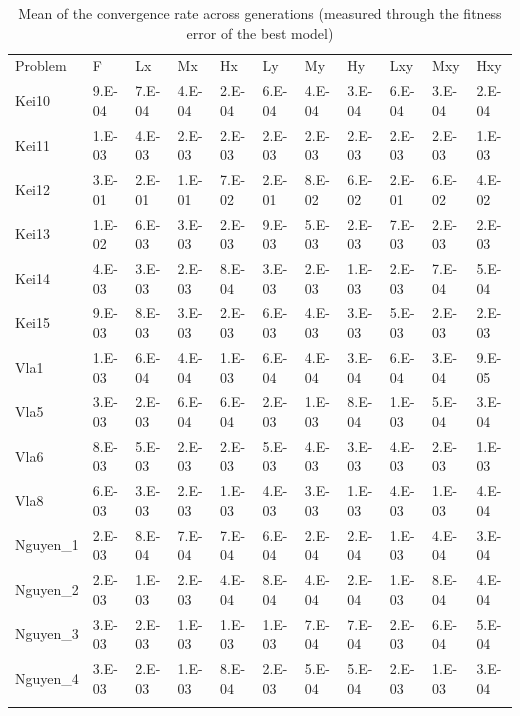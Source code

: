 \begin{table}
\caption{Mean of the convergence rate across generations (measured through the fitness error of the best model)}
\label{tab:CR}       %
\begin{tabular}{lllllllllll}
\hline\noalign{\smallskip}
Problem & F & Lx & Mx & Hx & Ly & My & Hy & Lxy & Mxy & Hxy  \\
\noalign{\smallskip}\hline\noalign{\smallskip}
Kei10 & 9.E-04 & 7.E-04 & 4.E-04 & 2.E-04 & 6.E-04 & 4.E-04 & 3.E-04 & 6.E-04 & 3.E-04 & 2.E-04 \\
Kei11 & 1.E-03 & 4.E-03 & 2.E-03 & 2.E-03 & 2.E-03 & 2.E-03 & 2.E-03 & 2.E-03 & 2.E-03 & 1.E-03 \\
Kei12 & 3.E-01 & 2.E-01 & 1.E-01 & 7.E-02 & 2.E-01 & 8.E-02 & 6.E-02 & 2.E-01 & 6.E-02 & 4.E-02 \\
Kei13 & 1.E-02 & 6.E-03 & 3.E-03 & 2.E-03 & 9.E-03 & 5.E-03 & 2.E-03 & 7.E-03 & 2.E-03 & 2.E-03 \\
Kei14 & 4.E-03 & 3.E-03 & 2.E-03 & 8.E-04 & 3.E-03 & 2.E-03 & 1.E-03 & 2.E-03 & 7.E-04 & 5.E-04 \\
Kei15 & 9.E-03 & 8.E-03 & 3.E-03 & 2.E-03 & 6.E-03 & 4.E-03 & 3.E-03 & 5.E-03 & 2.E-03 & 2.E-03 \\
Vla1 & 1.E-03 & 6.E-04 & 4.E-04 & 1.E-03 & 6.E-04 & 4.E-04 & 3.E-04 & 6.E-04 & 3.E-04 & 9.E-05 \\
Vla5 & 3.E-03 & 2.E-03 & 6.E-04 & 6.E-04 & 2.E-03 & 1.E-03 & 8.E-04 & 1.E-03 & 5.E-04 & 3.E-04 \\
Vla6 & 8.E-03 & 5.E-03 & 2.E-03 & 2.E-03 & 5.E-03 & 4.E-03 & 3.E-03 & 4.E-03 & 2.E-03 & 1.E-03 \\
Vla8 & 6.E-03 & 3.E-03 & 2.E-03 & 1.E-03 & 4.E-03 & 3.E-03 & 1.E-03 & 4.E-03 & 1.E-03 & 4.E-04 \\
Nguyen\_1 & 2.E-03 & 8.E-04 & 7.E-04 & 7.E-04 & 6.E-04 & 2.E-04 & 2.E-04 & 1.E-03 & 4.E-04 & 3.E-04 \\
Nguyen\_2 & 2.E-03 & 1.E-03 & 2.E-03 & 4.E-04 & 8.E-04 & 4.E-04 & 2.E-04 & 1.E-03 & 8.E-04 & 4.E-04 \\
Nguyen\_3 & 3.E-03 & 2.E-03 & 1.E-03 & 1.E-03 & 1.E-03 & 7.E-04 & 7.E-04 & 2.E-03 & 6.E-04 & 5.E-04 \\
Nguyen\_4 & 3.E-03 & 2.E-03 & 1.E-03 & 8.E-04 & 2.E-03 & 5.E-04 & 5.E-04 & 2.E-03 & 1.E-03 & 3.E-04 \\
\noalign{\smallskip}\hline
\end{tabular}
\end{table}
